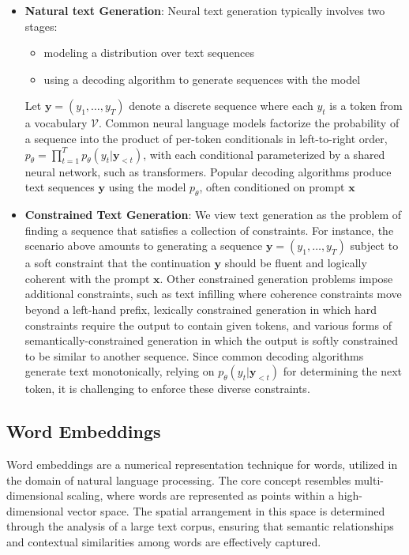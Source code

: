 \documentclass{article}
\begin{document}
\begin{itemize}
    \item \textbf{Natural text Generation}: Neural text generation typically involves two stages:
          \begin{itemize}
              \item modeling a distribution over text sequences
              \item using a decoding algorithm to generate sequences with the model
          \end{itemize}
          Let $\boldsymbol{y} = (y_1, \ldots, y_T)$ denote a discrete sequence where each $y_t$ is a token from a vocabulary $\mathcal{V}$. Common neural language models factorize the probability of a sequence into the product of per-token conditionals in left-to-right order, $p_{\theta} = \prod_{t=1}^{T} p_{\theta} (y_t | \boldsymbol{y}_{<t})$, with each conditional parameterized by a shared neural network, such as transformers. Popular decoding algorithms produce text sequences $\boldsymbol{y}$ using the model $p_{\theta}$, often conditioned on prompt $\boldsymbol{x}$
    \item \textbf{Constrained Text Generation}: We view text generation as the problem of finding a sequence that
          satisfies a collection of constraints. For instance, the scenario above amounts to generating a sequence $\boldsymbol{y} = (y_1, \ldots, y_T)$ subject to a soft constraint that the continuation $\boldsymbol{y}$ should be fluent and logically coherent with the prompt $\boldsymbol{x}$. Other constrained generation problems impose additional constraints, such as text infilling where coherence constraints move beyond a left-hand prefix, lexically constrained generation in which hard constraints require the output to contain given tokens, and various forms of semantically-constrained generation in which the output is softly constrained to be similar to another sequence. Since common decoding algorithms generate text monotonically, relying
          on $p_{\theta} (y_t | \boldsymbol{y}_{<t})$ for determining the next token, it is challenging to enforce these diverse constraints.
\end{itemize}







\subsection{Word Embeddings}

Word embeddings are a numerical representation technique for words, utilized in the domain of natural language processing. The core concept resembles multi-dimensional scaling, where words are represented as points within a high-dimensional vector space. The spatial arrangement in this space is determined through the analysis of a large text corpus, ensuring that semantic relationships and contextual similarities among words are effectively captured.
\end{document}
